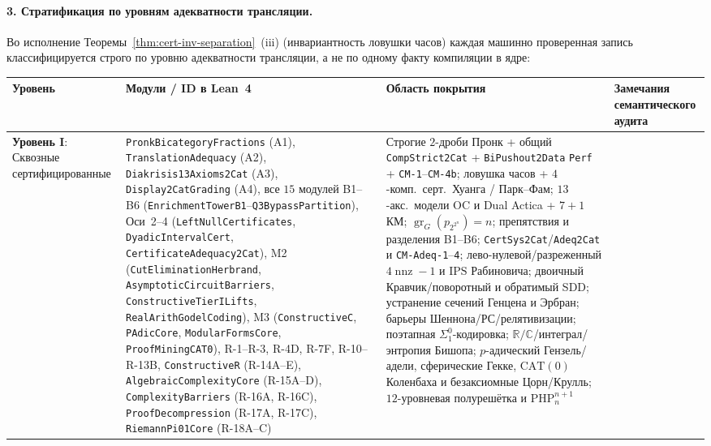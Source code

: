 \documentclass[11pt]{article}
\theoremstyle{plain}
\theoremstyle{definition}
\newcommand{\gr}{\operatorname{gr}}
\begin{document}
\paragraph{3. Стратификация по уровням адекватности трансляции.}
Во исполнение Теоремы~\ref{thm:cert-inv-separation}~(iii) (инвариантность ловушки часов) каждая машинно проверенная запись классифицируется строго по уровню адекватности трансляции, а не по одному факту компиляции в ядре:
\begin{center}\footnotesize
\begin{tabular}{@{} >{\raggedright\arraybackslash}p{2.3cm} >{\raggedright\arraybackslash}p{3.9cm} >{\raggedright\arraybackslash}p{3.9cm} >{\raggedright\arraybackslash}p{3.9cm} @{}}
\toprule
Уровень & Модули / ID в Lean~4 & Область покрытия & Замечания семантического аудита \\ \midrule
\textbf{Уровень I}: Сквозные сертифицированные &
\texttt{PronkBicategory\allowbreak Fractions} (A1), \texttt{Translation\allowbreak Adequacy} (A2), \texttt{Diakrisis13\allowbreak Axioms2Cat} (A3), \texttt{Display2Cat\allowbreak Grading} (A4), все $15$ модулей B1--B6 (\texttt{EnrichmentTowerB1}--\texttt{Q3BypassPartition}), Оси~2--4 (\texttt{LeftNull\allowbreak Certificates}, \texttt{DyadicIntervalCert}, \texttt{Certificate\allowbreak Adequacy2Cat}), M2 (\texttt{CutElimination\allowbreak Herbrand}, \texttt{Asymptotic\allowbreak CircuitBarriers}, \texttt{Constructive\allowbreak TierILifts}, \texttt{RealArith\allowbreak GodelCoding}), M3 (\texttt{ConstructiveC}, \texttt{PAdicCore}, \texttt{ModularFormsCore}, \texttt{ProofMiningCAT0}), R-1--R-3, R-4D, R-7F, R-10--R-13B, \texttt{ConstructiveR} (R-14A--E), \texttt{Algebraic\allowbreak ComplexityCore} (R-15A--D), \texttt{ComplexityBarriers} (R-16A, R-16C), \texttt{ProofDecompression} (R-17A, R-17C), \texttt{RiemannPi01Core} (R-18A--C) &
Строгие $2$-дроби Пронк + общий \texttt{CompStrict2Cat} + \texttt{BiPushout2Data} \texttt{Perf} + \texttt{CM-1}--\texttt{CM-4b}; ловушка часов + $4$-комп.\ серт.\ Хуанга / Парк--Фам; $13$-акс.\ модели OC и Dual Actica + $7+1$ КМ; $\gr_G(p_{2^{2^n}})=n$; препятствия и разделения B1--B6; \texttt{CertSys2Cat}/\texttt{Adeq2Cat} и \texttt{CM-Adeq-1}--\texttt{4}; лево-нулевой/разреженный $4\operatorname{nnz}-1$ и $\mathrm{IPS}$ Рабиновича; двоичный Кравчик/поворотный и обратимый SDD; устранение сечений Генцена и Эрбран; барьеры Шеннона/РС/релятивизации; поэтапная $\Sigma^0_1$-кодировка; $\mathbb{R}/\mathbb{C}$/интеграл/энтропия Бишопа; $p$-адический Гензель/адели, сферические Гекке, $\mathrm{CAT}(0)$ Коленбаха и безаксиомные Цорн/Крулль; $12$-уровневая полурешётка и $\mathrm{PHP}_n^{n+1}$ &

\end{tabular}
\end{center}
\end{document}
